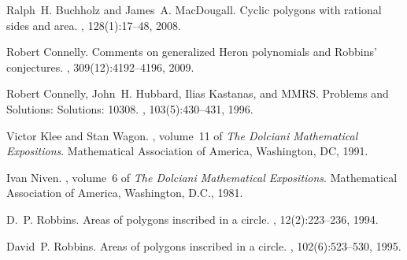 \documentclass[11pt]{article}
\numberwithin{equation}{section}
\numberwithin{figure}{section}
\newcommand{\Z}{\mathbb Z}
\begin{document}
%
%

%
\begin{thebibliography}{1}

Ralph~H. Buchholz and James~A. MacDougall.
\newblock Cyclic polygons with rational sides and area.
, 128(1):17--48, 2008.

Robert Connelly.
\newblock Comments on generalized {H}eron polynomials and {R}obbins'
  conjectures.
, 309(12):4192--4196, 2009.

Robert Connelly, John~H. Hubbard, Ilias Kastanas, and MMRS.
\newblock Problems and {S}olutions: {S}olutions: 10308.
, 103(5):430--431, 1996.

Victor Klee and Stan Wagon.
, volume~11 of {\em The Dolciani Mathematical Expositions}.
\newblock Mathematical Association of America, Washington, DC, 1991.

Ivan Niven.
, volume~6 of {\em The
  Dolciani Mathematical Expositions}.
\newblock Mathematical Association of America, Washington, D.C., 1981.

D.~P. Robbins.
\newblock Areas of polygons inscribed in a circle.
, 12(2):223--236, 1994.

David~P. Robbins.
\newblock Areas of polygons inscribed in a circle.
, 102(6):523--530, 1995.

\end{thebibliography}
\end{document}
